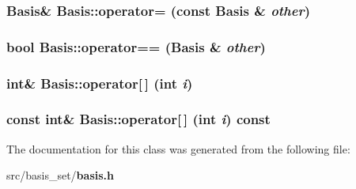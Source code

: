 \subsubsection{\setlength{\rightskip}{0pt plus 5cm}\bf{Basis}\& Basis::operator= (const \bf{Basis} \& {\em other})\hspace{0.3cm}{\tt  [inline]}}\label{classBasis_fd5650dec6aaccc00757c4755c313d7f}


\subsubsection{\setlength{\rightskip}{0pt plus 5cm}bool Basis::operator== (\bf{Basis} \& {\em other})\hspace{0.3cm}{\tt  [inline]}}\label{classBasis_aaa231cb3f036c5c94e0eec944a3ee71}


\subsubsection{\setlength{\rightskip}{0pt plus 5cm}int\& Basis::operator[$\,$] (int {\em i})\hspace{0.3cm}{\tt  [inline]}}\label{classBasis_cfd0aa46d9a6678ac410ad5343f975ef}


\subsubsection{\setlength{\rightskip}{0pt plus 5cm}const int\& Basis::operator[$\,$] (int {\em i}) const\hspace{0.3cm}{\tt  [inline]}}\label{classBasis_93ce305ce40e8f8e2308d43740ffcdc4}




The documentation for this class was generated from the following file:\begin{CompactItemize}
\item 
src/basis\_\-set/\bf{basis.h}\end{CompactItemize}
